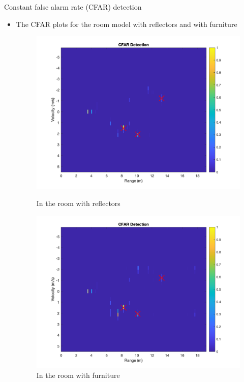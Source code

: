 \documentclass{beamer}
\begin{document}
\begin{frame}[t]{Constant false alarm rate (CFAR) detection}
	\begin{itemize}
        \item The CFAR plots for the room model with reflectors and with furniture
         \vspace{0.5\baselineskip}
            \begin{figure}
                \centering
                \begin{minipage}{0.45\textwidth}
                    \centering
                    \includegraphics[height=0.8\textwidth]{figures/2c_reflectors_pre.png}
                    \caption{In the room with reflectors}
                \end{minipage}
                \begin{minipage}{0.45\textwidth}
                    \centering
                    \includegraphics[height=0.8\textwidth]{figures/2c_furniture_pre.png}
                    \caption{In the room with furniture}
                \end{minipage}
            \end{figure}
    \end{itemize}
\end{frame}
\end{document}
